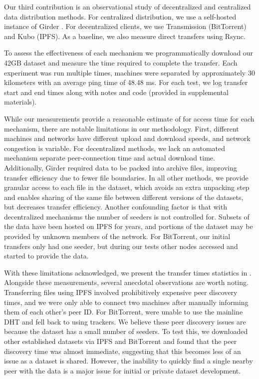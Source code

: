 \documentclass[10pt,twocolumn,letterpaper]{article}
\begin{document}
Our third contribution is an observational study of decentralized and centralized data distribution methods.
For centralized distribution, we use a self-hosted instance of Girder
  \cite{girder_2024}.
For decentralized clients, we use Transmission \cite{transmission_2024} (BitTorrent)
  and Kubo \cite{ipfskubo_2024} (IPFS).
As a baseline, we also measure direct transfers using Rsync\cite{rsyncprojectrsync_2024}.


To assess the effectiveness of each mechanism we programmatically download our 42GB dataset and measure the
  time required to complete the transfer.
Each experiment was run multiple times, machines were separated by approximately 30 kilometers with an
  average ping time of 48.48 ms.
For each test, we log transfer start and end times along with notes and code (provided in supplemental
  materials).

While our measurements provide a reasonable estimate of for access time for each mechanism, there are
  notable limitations in our methodology.
First, different machines and networks have different upload and download speeds, and network congestion is
  variable.
For decentralized methods, we lack an automated mechanism separate peer-connection time and actual download
  time.
Additionally, Girder required data to be packed into archive files, improving transfer efficiency due to
  fewer file boundaries.
In all other methods, we provide granular access to each file in the dataset, which avoids an extra
  unpacking step and enables sharing of the same file between different versions of the datasets, but
  decreases transfer efficiency.
Another confounding factor is that with decentralized mechanisms the number of seeders is not controlled
  for.
Subsets of the data have been hosted on IPFS for years, and portions of the dataset may be provided by
  unknown members of the network.
For BitTorrent, our initial transfers only had one seeder, but during our tests other nodes accessed and
  started to provide the data.

With these limitations acknowledged, we present the transfer times statistics in .
Alongside these measurements, several anecdotal observations are worth noting.
Transferring files using IPFS involved prohibitively expensive peer discovery times, and we were only able
  to connect two machines after manually informing them of each other's peer ID.
For BitTorrent, were unable to use the mainline DHT and fell back to using trackers.
We believe these peer discovery issues are because the dataset has a small number of seeders.
To test this, we downloaded other established datasets via IPFS and BitTorrent and found that the peer
  discovery time was almost immediate, suggesting that this becomes less of an issue as a dataset is shared.
However, the inability to quickly find a single nearby peer with the data is a major issue for initial or
  private dataset development.
\end{document}
